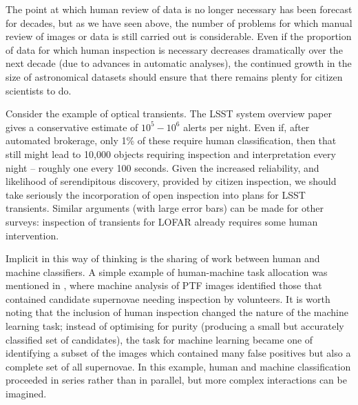 \documentclass{ar2e}
\begin{document}
The point at which human review of data is no longer necessary has been forecast
for decades, but as we have seen above, the number of problems for which manual
review of images or data is still carried out is considerable. Even if the
proportion of data for which human inspection is necessary decreases
dramatically over the next decade (due to advances in automatic analyses), the
continued growth in the size of astronomical datasets should ensure that there
remains plenty for citizen scientists to do. 

Consider the example of optical transients. The LSST system overview paper
\citep{LSSTsystem} gives a conservative estimate of $10^5-10^6$ alerts per
night. Even if, after automated brokerage, only 1\% of these require human
classification, then that still might lead to 10,000 objects requiring
inspection and interpretation every night -- roughly one every 100 seconds.
Given the increased reliability, and likelihood of serendipitous discovery,
provided by citizen inspection, we should take seriously the incorporation of
open inspection into plans for LSST transients. Similar arguments (with large
error bars) can be made for other surveys: inspection of transients for LOFAR
already requires some human intervention. 


Implicit in this way of thinking is the sharing of work between human and
machine classifiers.  A simple example of human-machine task allocation was
mentioned in , where machine analysis of PTF images
identified those that contained candidate supernovae needing inspection by
volunteers. It is worth noting that the inclusion of human inspection changed
the nature of the machine learning task; instead of optimising for purity
(producing a small but accurately classified set of candidates), the task for
machine learning became one of identifying a subset of the images which
contained many false positives but also a complete set of all supernovae. 
In this example, human and machine classification proceeded in series rather
than in parallel, but more complex interactions can be imagined. 
\end{document}
